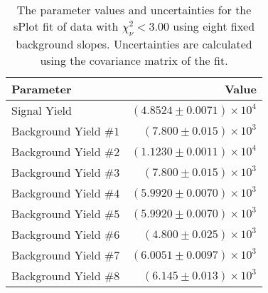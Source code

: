 
\begin{table}[h]
    \begin{center}
        \begin{tabular}{lr}\toprule
            Parameter & Value \\\midrule
            Signal Yield & $(4.8524 \pm 0.0071) \times 10^{4}$ \\
            Background Yield $\#1$ & $(7.800 \pm 0.015) \times 10^{3}$ \\
            Background Yield $\#2$ & $(1.1230 \pm 0.0011) \times 10^{4}$ \\
            Background Yield $\#3$ & $(7.800 \pm 0.015) \times 10^{3}$ \\
            Background Yield $\#4$ & $(5.9920 \pm 0.0070) \times 10^{3}$ \\
            Background Yield $\#5$ & $(5.9920 \pm 0.0070) \times 10^{3}$ \\
            Background Yield $\#6$ & $(4.800 \pm 0.025) \times 10^{3}$ \\
            Background Yield $\#7$ & $(6.0051 \pm 0.0097) \times 10^{3}$ \\
            Background Yield $\#8$ & $(6.145 \pm 0.013) \times 10^{3}$ \\\bottomrule
        \end{tabular}
        \caption{The parameter values and uncertainties for the sPlot fit of data with $\chi^2_\nu < 3.00$ using eight fixed background slopes. Uncertainties are calculated using the covariance matrix of the fit.}
    \end{center}
\end{table}
